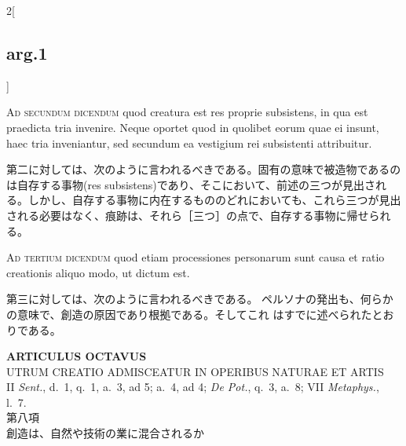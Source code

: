 \documentclass[paper=a4paper,fontsize=10pt,jafontsize=9pt,titlepage]{jlreq}
\begin{document}
\begin{paracol}{2}[\subsection{arg.1}]
\switchcolumn*[\subsection{ad.2}]

{\scshape Ad secundum dicendum} quod creatura est res
 proprie subsistens, in qua est praedicta tria invenire. Neque oportet
 quod in quolibet eorum quae ei insunt, haec tria inveniantur, sed
 secundum ea vestigium rei subsistenti attribuitur.

\switchcolumn

第二に対しては、次のように言われるべきである。固有の意味で被造物であるの
は自存する事物(res subsistens)であり、そこにおいて、前述の三つが見出され
る。しかし、自存する事物に内在するもののどれにおいても、これら三つが見出
される必要はなく、痕跡は、それら［三つ］の点で、自存する事物に帰せられる。

\switchcolumn*[\subsection{ad.3}]

{\scshape Ad tertium dicendum} quod etiam processiones
 personarum sunt causa et ratio creationis aliquo modo, ut dictum est.

\switchcolumn

第三に対しては、次のように言われるべきである。
ペルソナの発出も、何らかの意味で、創造の原因であり根拠である。そしてこれ
 はすでに述べられたとおりである。

\end{paracol}
\newpage
{}
{}
\setcounter{section}{8}
\setcounter{subsection}{0}



\begin{center}
 {\Large {\bfseries ARTICULUS OCTAVUS}}\\
 {\large UTRUM CREATIO ADMISCEATUR IN OPERIBUS NATURAE ET ARTIS}\\
 {\footnotesize II {\itshape Sent.}, d.~1, q.~1, a.~3, ad 5; a.~4, ad 4;
 {\itshape De Pot.}, q.~3, a.~8; VII {\itshape Metaphys.}, l.~7.}\\
 {\Large 第八項\\創造は、自然や技術の業に混合されるか}
\end{center}
\end{document}
